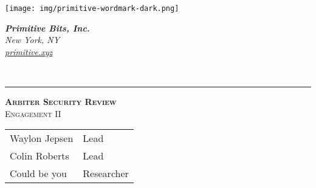 \documentclass[14pt]{extarticle}
\begin{document}
\setmainfont{Daggersquare regular.otf}


\begin{titlepage}
    \begin{minipage}[c]{0.4\textwidth}
      \texttt{[image: img/primitive-wordmark-dark.png]} \\  %
    \end{minipage}
    \hspace{0.4\textwidth}
    \begin{minipage}[c]{0.2\textwidth}
      \begin{flushleft}
          \small
          \textit{\textbf{Primitive Bits, Inc.}\\  %
          New York, NY\\
          \href{http://primitive.xyz}{primitive.xyz}\\}
      \end{flushleft}
    \end{minipage} \\
    \begin{flushleft}
      {\small\color{gray}{
      \today}}
      \vspace{2cm}  %
      \hspace{2cm}  %
      \hspace{2cm}  %
      \hrule 
      \vspace{0.5cm}  %
      \hspace{2cm}  %
      \hspace{2cm}  %
    \end{flushleft}
    \begin{flushleft}
      \textsc{\LARGE \bfseries Arbiter Security Review}\\[0.5 cm]  %
      \textsc{\large Engagement II}\\[2.0 cm]  %
  
      \begin{tabular}{ll}  %
        Waylon Jepsen & Lead \\
        Colin Roberts & Lead \\
        Could be you & Researcher \\
      \end{tabular}
  
      \vfill
  
    \end{flushleft}
  \end{titlepage}
\end{document}
